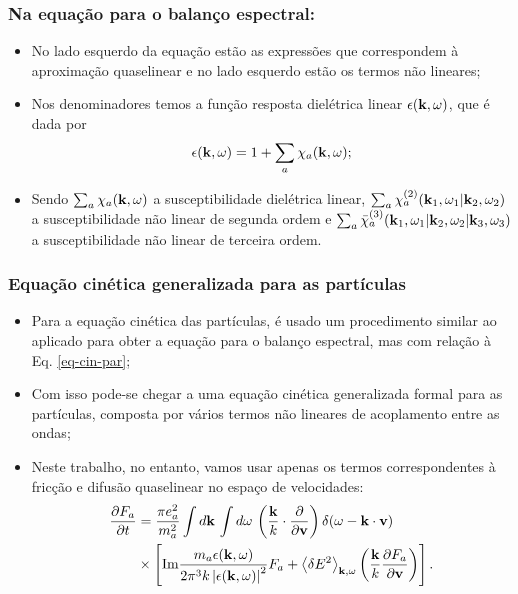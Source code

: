 \documentclass[10pt,aspectratio=1610,lualatex]{beamer}
\begin{document}
\begin{frame}
  \frametitle{Na equação para o balanço espectral:}
  \begin{itemize}
    \item No lado esquerdo da equação estão as expressões que correspondem
    à aproximação quaselinear e no lado esquerdo estão os termos não lineares;
    \vspace{0.5cm}
    \item Nos denominadores temos a função resposta dielétrica linear
    $\epsilon({\bf k},\omega)$, que é dada por
    \begin{equation*}
      \epsilon({\bf k},\omega)=1+\sum_a\chi_a({\bf k},\omega);
    \end{equation*}
    \item Sendo $\sum_a \chi_a({\bf k},\omega)$ a susceptibilidade dielétrica
    linear, $\sum_a \chi_a^{(2)}({\bf k}_1,\omega_1|{\bf k}_2,\omega_2)$ a
    susceptibilidade não linear de segunda ordem e
    $\sum_a \bar \chi_a^{(3)}({\bf k}_1,\omega_1|{\bf k}_2,\omega_2|{\bf k}_3,\omega_3)$
    a susceptibilidade não linear de terceira ordem.
  \end{itemize}
\end{frame}

\begin{frame}
  \frametitle{Equação cinética generalizada para as partículas}
  \begin{itemize}
    \item Para a equação cinética das partículas, é usado um procedimento
    similar ao aplicado para obter a equação para o balanço espectral, mas
    com relação à Eq. \eqref{eq-cin-par};
    \vspace{0.4cm}
    \item Com isso pode-se chegar a uma equação cinética generalizada formal
    para as partículas, composta por vários termos não lineares de acoplamento
    entre as ondas;
    \vspace{0.4cm}
    \item Neste trabalho, no entanto, vamos usar apenas os termos correspondentes
    à fricção e difusão quaselinear no espaço de velocidades:
    \begin{equation*}
      \begin{split}
	\frac{\partial F_a}{\partial t}
	&=\frac{\pi e_a^2}{m_a^2}\int d{\bf k}\,\int d\omega\,
	\left( \frac{\bf k}{k}\cdot
	  \frac{\partial}{\partial {\bf v}}\right)
	\delta(\omega -{\bf k \cdot v})\\
	&\times\left[\mbox{Im} \frac{m_a \epsilon({\bf k},\omega)}
	  {2\pi^3k \left|\epsilon ({\bf k},\omega) \right|^2 } F_a
	  +\left<\delta E^2\right>_{{\bf k},\omega}\left(\frac{\bf k}{k}
	    \frac{\partial F_a}{\partial \bf v}\right)\right].
      \end{split}
    \end{equation*}
  \end{itemize}
\end{frame}
\end{document}
